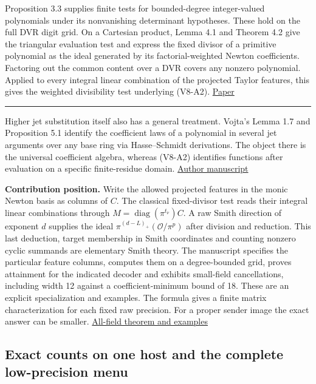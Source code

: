 \documentclass[11pt,a4paper]{article}
\newlength{\OfflineResearchTableWidth}
\newcommand{\OfflineResearchHeaderRule}{\noindent\rule{\linewidth}{0.45pt}\par}
\newcommand{\OfflineResearchRow}{\par}
\newenvironment{OfflineResearchTable}{%
  \par\medskip\begingroup\small\setlength{\parindent}{0pt}%
  \setlength{\parskip}{3pt plus 1pt minus .5pt}%
  \setlength{\OfflineResearchTableWidth}{\linewidth}%
}{%
  \par\endgroup\medskip%
}
\begin{document}
\begin{OfflineResearchTable}
\begin{minipage}[t]{0.67095\OfflineResearchTableWidth}\raggedright
Proposition 3.3 supplies finite tests for bounded-degree integer-valued
polynomials under its nonvanishing determinant hypotheses. These hold on
the full DVR digit grid. On a Cartesian product, Lemma 4.1 and Theorem
4.2 give the triangular evaluation test and express the fixed divisor of
a primitive polynomial as the ideal generated by its factorial-weighted
Newton coefficients. Factoring out the common content over a DVR covers
any nonzero polynomial. Applied to every integral linear combination of
the projected Taylor features, this gives the weighted divisibility test
underlying (V8-A2). \href{https://arxiv.org/pdf/1803.05780}{Paper}
\end{minipage}%
\OfflineResearchRow
\OfflineResearchHeaderRule
\end{OfflineResearchTable}

Higher jet substitution itself also has a general treatment. Vojta's
Lemma 1.7 and Proposition 5.1 identify the coefficient laws of a
polynomial in several jet arguments over any base ring via
Hasse--Schmidt derivations. The object there is the universal
coefficient algebra, whereas (V8-A2) identifies functions after evaluation
on a specific finite-residue domain.
\href{https://math.berkeley.edu/~vojta/jets.pdf}{Author manuscript}

\textbf{Contribution position.} Write the allowed projected features in
the monic Newton basis as columns of \(C\). The classical fixed-divisor
test reads their integral linear combinations through
\(M=\operatorname{diag}(\pi^{t_\nu})C\). A raw Smith direction of
exponent \(d\) supplies the ideal \(\pi^{(d-L)_+}(\mathcal O/\pi^p)\)
after division and reduction. This last deduction, target membership in
Smith coordinates and counting nonzero cyclic summands are elementary
Smith theory. The manuscript specifies the particular feature columns,
computes them on a degree-bounded grid, proves attainment for the
indicated decoder and exhibits small-field cancellations, including
width 12 against a coefficient-minimum bound of 18. These are an
explicit specialization and examples. The formula gives a finite matrix
characterization for each fixed raw precision. For a proper sender image
the exact answer can be smaller.
\hyperref[v8-section-jet-newton-smith]{All-field theorem and examples}

\subsection{Exact counts on one host and the complete low-precision
menu}\label{v8-exact-counts-on-one-host-and-the-complete-low-precision-menu}
\end{document}

